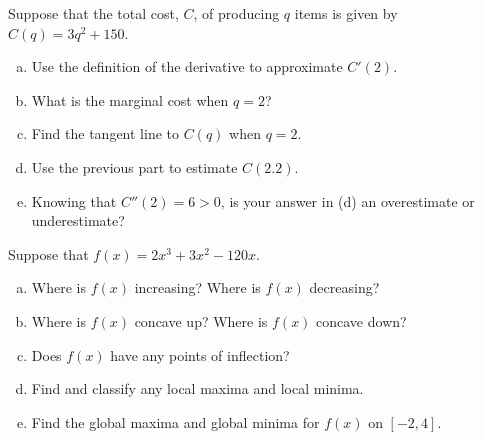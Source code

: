 \documentclass[11pt,letterpaper]{article}
\begin{document}
\prob Suppose that the total cost, $C$, of producing $q$ items is given by $C(q)= 3q^2 + 150$. 
	\begin{enumerate}[(a)]
	\item Use the definition of the derivative to approximate $C'(2)$.
	\item What is the marginal cost when $q= 2$?
	\item Find the tangent line to $C(q)$ when $q= 2$.
	\item Use the previous part to estimate $C(2.2)$. 
	\item Knowing that $C''(2)= 6 > 0$, is your answer in (d) an overestimate or underestimate? 
	\end{enumerate} \pspace



\prob Suppose that $f(x)= 2x^3 + 3x^2 - 120x$. 
	\begin{enumerate}[(a)]
	\item Where is $f(x)$ increasing? Where is $f(x)$ decreasing?
	\item Where is $f(x)$ concave up? Where is $f(x)$ concave down?
	\item Does $f(x)$ have any points of inflection?
	\item Find and classify any local maxima and local minima. 
	\item Find the global maxima and global minima for $f(x)$ on $[-2, 4]$.
	\end{enumerate}
\end{document}
